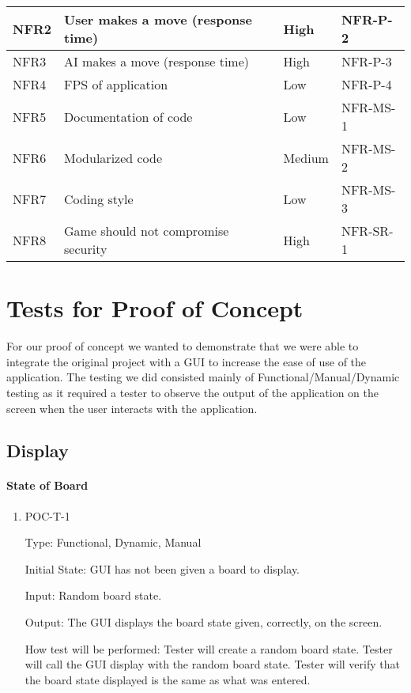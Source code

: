 \documentclass[12pt, titlepage]{article}
\begin{document}
\begin{table}[h!]
\begin{center}
\begin{adjustwidth}{-1.5cm}{}
\begin{tabularx}{1.2\textwidth}{|p{3.4cm}|p{7cm}|p{1.6cm}|X|}
		\hline
		NFR2 & User makes a move (response time) & High & NFR-P-2 \\
		\hline
		NFR3 & AI makes a move (response time) & High & NFR-P-3 \\
		\hline
		NFR4 & FPS of application & Low & NFR-P-4 \\
		\hline
		NFR5 & Documentation of code & Low & NFR-MS-1 \\
		\hline
		NFR6 & Modularized code & Medium & NFR-MS-2 \\
		\hline
		NFR7 & Coding style & Low & NFR-MS-3 \\
		\hline
		NFR8 & Game should not compromise security & High & NFR-SR-1 \\
		\hline
	\end{tabularx}
	\end{adjustwidth}
	\end{center}
\end{table}


\section{Tests for Proof of Concept}
For our proof of concept we wanted to demonstrate that we were able to integrate the original project with a GUI to increase the ease of use of the application. The testing we did consisted mainly of Functional/Manual/Dynamic testing as it required a tester to observe the output of the application on the screen when the user interacts with the application.

\subsection{Display}
		
\paragraph{State of Board}
\begin{enumerate}
\item{POC-T-1}

Type: Functional, Dynamic, Manual

Initial State: GUI has not been given a board to display.
					
Input: Random board state.
					
Output: The GUI displays the board state given, correctly, on the screen.
					
How test will be performed: Tester will create a random board state. Tester will call the GUI display with the random board state. Tester will verify that the board state displayed is the same as what was entered.
\end{enumerate}
\end{document}
